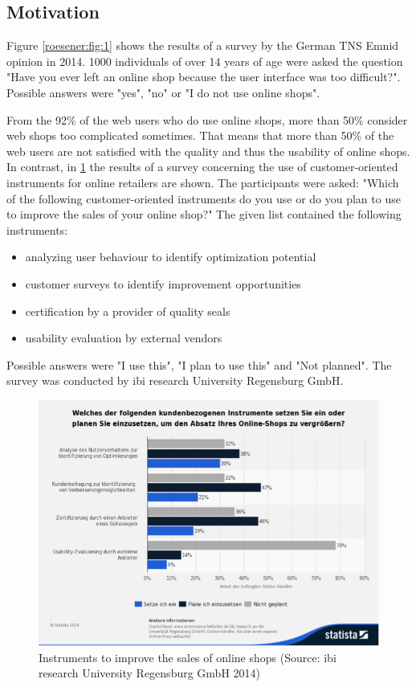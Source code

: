 \documentclass[output=paper]{langsci/langscibook}
\begin{document}
\subsection{Motivation}

Figure \ref{roesener:fig:1} shows the results of a survey by the German TNS Emnid opinion in 2014. 1000 individuals of over 14 years of age were asked the question "Have you ever left an online shop because the user interface was too difficult?". Possible answers were "yes", "no" or "I do not use online shops".


From the 92\% of the web users who do use online shops, more than 50\% consider web shops too complicated sometimes. That means that more than 50\% of the web users are not satisfied with the quality and thus the usability of online shops. In contrast, in \ref{roesener:fig:2} the results of a survey concerning the use of customer-oriented instruments for online retailers are shown. The participants were asked: "Which of the following customer-oriented instruments do you use or do you plan to use to improve the sales of your online shop?" The given list contained the following instruments:


\begin{itemize}
\item analyzing user behaviour to identify optimization potential 
\item customer surveys to identify improvement opportunities 
\item certification by a provider of quality seals 
\item usability evaluation by external vendors 
\end{itemize}

Possible answers were "I use this", "I plan to use this" and "Not planned". The survey was conducted by ibi research University Regensburg GmbH. 

\begin{figure}
 \includegraphics[width=\textwidth]{figures/Roesener2.png}
 \caption{Instruments to improve the sales of online shops (Source: ibi research University Regensburg GmbH 2014)}
 \label{roesener:fig:2}
\end{figure} 
\end{document}
